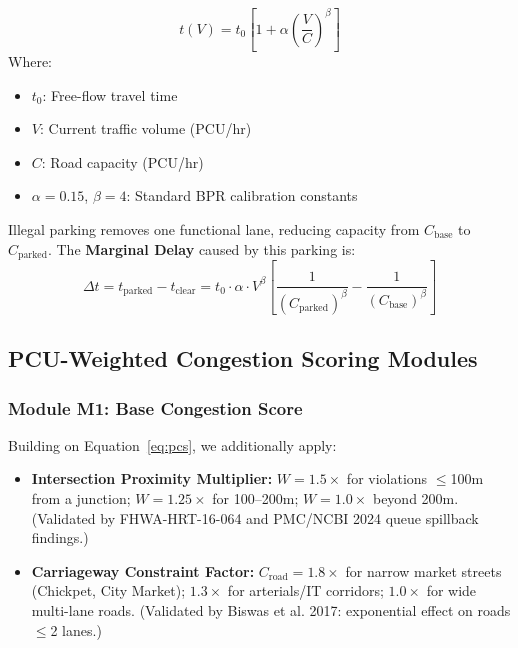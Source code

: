 \documentclass[12pt,a4paper]{article}
\begin{document}
\begin{tcolorbox}[formulabox]
\begin{equation}
    t(V) = t_0 \left[ 1 + \alpha \left(\frac{V}{C}\right)^\beta \right]
    \label{eq:bpr}
\end{equation}
Where:
\begin{itemize}[leftmargin=2em, itemsep=2pt]
    \item $t_0$: Free-flow travel time
    \item $V$: Current traffic volume (PCU/hr)
    \item $C$: Road capacity (PCU/hr)
    \item $\alpha = 0.15$, $\beta = 4$: Standard BPR calibration constants
\end{itemize}

Illegal parking removes one functional lane, reducing capacity from $C_\text{base}$ to $C_\text{parked}$. The \textbf{Marginal Delay} caused by this parking is:
\begin{equation}
    \Delta t = t_\text{parked} - t_\text{clear} = t_0 \cdot \alpha \cdot V^\beta \left[\frac{1}{(C_\text{parked})^\beta} - \frac{1}{(C_\text{base})^\beta}\right]
    \label{eq:marginal_delay}
\end{equation}
\end{tcolorbox}

\subsection{PCU-Weighted Congestion Scoring Modules}

\subsubsection{Module M1: Base Congestion Score}

Building on Equation~\ref{eq:pcs}, we additionally apply:
\begin{itemize}
    \item \textbf{Intersection Proximity Multiplier:} $W = 1.5\times$ for violations $\leq$100m from a junction; $W = 1.25\times$ for 100--200m; $W = 1.0\times$ beyond 200m. (Validated by FHWA-HRT-16-064 and PMC/NCBI 2024 queue spillback findings.)
    \item \textbf{Carriageway Constraint Factor:} $C_\text{road} = 1.8\times$ for narrow market streets (Chickpet, City Market); $1.3\times$ for arterials/IT corridors; $1.0\times$ for wide multi-lane roads. (Validated by Biswas et al. 2017: exponential effect on roads $\leq$2 lanes.)
\end{itemize}
\end{document}
